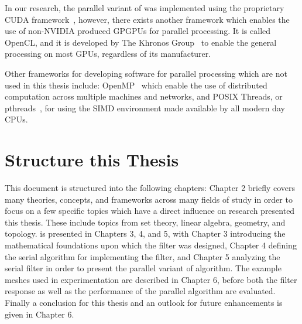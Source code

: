 In our research, the parallel variant of  was implemented using the proprietary CUDA framework~\cite{CUDA18}, however, there exists another framework which enables the use of non-NVIDIA produced \glspl{GPGPU} for parallel processing. It is called OpenCL, and it is developed by The Khronos Group~\cite{Khronos19} to enable the general processing on most \glspl{GPU}, regardless of its manufacturer.

Other frameworks for developing software for parallel processing which are not used in this thesis include: OpenMP~\cite{OpenMP19} which enable the use of distributed computation across multiple machines and networks, and POSIX Threads, or pthreads~\cite[195-210]{Lang17}, for using the \gls{SIMD} environment made available by all modern day \glspl{CPU}.

%
%
%
%
%
%
\section{Structure this Thesis}
This document is structured into the following chapters: Chapter 2 briefly covers many theories, concepts, and frameworks across many fields of study in order to focus on a few specific topics which have a direct influence on research presented this thesis. These include topics from set theory, linear algebra, geometry, and topology.  is presented in Chapters 3, 4, and 5, with Chapter 3 introducing the mathematical foundations upon which the filter was designed, Chapter 4 defining the serial algorithm for implementing the filter, and Chapter 5 analyzing the serial filter in order to present the parallel variant of  algorithm. The example meshes used in experimentation are described in Chapter 6, before both the filter response as well as the performance of the parallel algorithm are evaluated. Finally a conclusion for this thesis and an outlook for future enhancements is given in Chapter 6.
